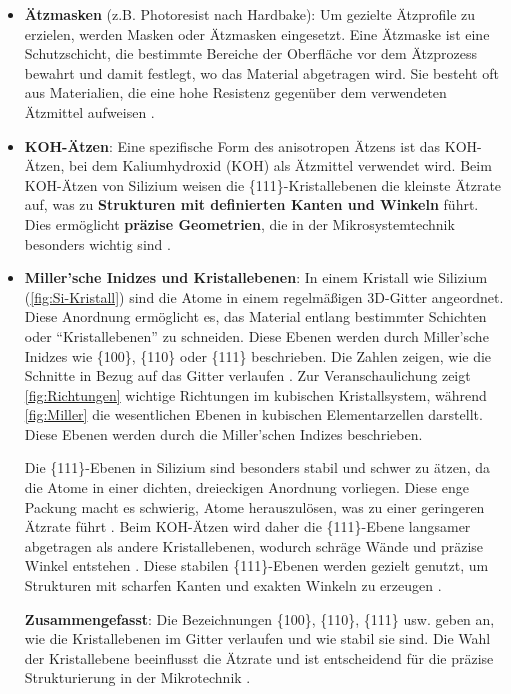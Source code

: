 \documentclass{article} %
\begin{document}
\begin{itemize}
    \item \textbf{Ätzmasken} (z.B. Photoresist nach Hardbake): Um gezielte Ätzprofile zu erzielen, werden Masken oder Ätzmasken eingesetzt. Eine Ätzmaske ist eine Schutzschicht, die bestimmte Bereiche der Oberfläche vor dem Ätzprozess bewahrt und damit festlegt, wo das Material abgetragen wird. Sie besteht oft aus Materialien, die eine hohe Resistenz gegenüber dem verwendeten Ätzmittel aufweisen \cite{madou2002, kern1983, wolf2000, sze1988, plummer2000}.
    \item \textbf{KOH-Ätzen}: Eine spezifische Form des anisotropen Ätzens ist das KOH-Ätzen, bei dem Kaliumhydroxid (KOH) als Ätzmittel verwendet wird. Beim KOH-Ätzen von Silizium weisen die \{111\}-Kristallebenen die kleinste Ätzrate auf, was zu \textbf{Strukturen mit definierten Kanten und Winkeln} führt. Dies ermöglicht \textbf{präzise Geometrien}, die in der Mikrosystemtechnik besonders wichtig sind \cite{madou2002, seidel1990, williams2003, li1997}.
    \item \textbf{Miller'sche Inidzes und Kristallebenen}: In einem Kristall wie Silizium (\autoref{fig:Si-Kristall}) sind die Atome in einem regelmäßigen 3D-Gitter angeordnet. Diese Anordnung ermöglicht es, das Material entlang bestimmter Schichten oder ``Kristallebenen'' zu schneiden. Diese Ebenen werden durch Miller'sche Inidzes wie \{100\}, \{110\} oder \{111\} beschrieben. Die Zahlen zeigen, wie die Schnitte in Bezug auf das Gitter verlaufen \cite{kittel2004, ashcroft1976, miller1839, hull1999, hammond2009}. Zur Veranschaulichung zeigt \autoref{fig:Richtungen} wichtige Richtungen im kubischen Kristallsystem, während \autoref{fig:Miller} die wesentlichen Ebenen in kubischen Elementarzellen darstellt. Diese Ebenen werden durch die Miller'schen Indizes beschrieben.

    Die \{111\}-Ebenen in Silizium sind besonders stabil und schwer zu ätzen, da die Atome in einer dichten, dreieckigen Anordnung vorliegen. Diese enge Packung macht es schwierig, Atome herauszulösen, was zu einer geringeren Ätzrate führt \cite{kittel2004, ashcroft1976}. Beim KOH-Ätzen wird daher die \{111\}-Ebene langsamer abgetragen als andere Kristallebenen, wodurch schräge Wände und präzise Winkel entstehen \cite{seidel1990}. Diese stabilen \{111\}-Ebenen werden gezielt genutzt, um Strukturen mit scharfen Kanten und exakten Winkeln zu erzeugen \cite{madou2002}.

    \textbf{Zusammengefasst}: Die Bezeichnungen \{100\}, \{110\}, \{111\} usw. geben an, wie die Kristallebenen im Gitter verlaufen und wie stabil sie sind. Die Wahl der Kristallebene beeinflusst die Ätzrate und ist entscheidend für die präzise Strukturierung in der Mikrotechnik \cite{kittel2004, ashcroft1976, madou2002}.


\end{itemize}
\end{document}
